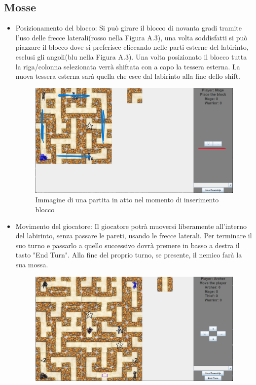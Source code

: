 \documentclass[a4paper,12pt]{report}
\begin{document}
\subsection*{Mosse}
\begin{itemize}
	\item Posizionamento del blocco: Si può girare il blocco di novanta gradi tramite l'uso delle frecce laterali(rosso nella Figura A.3), 
	una volta soddisfatti si può piazzare il blocco dove si preferisce cliccando nelle parti esterne del labirinto, esclusi gli angoli(blu nella Figura A.3).
	Una volta posizionato il blocco tutta la riga/colonna selezionata verrà shiftata con a capo la tessera esterna. La nuova tessera esterna sarà quella che 
	esce dal labirinto alla fine dello shift.
	\begin{figure}[H]
		\includegraphics[width=\textwidth]{img/EsempioDiPrimoTurno.png}
		\caption{Immagine di una partita in atto nel momento di inserimento blocco}
		\label{img:Esempio di primo turno}
	\end{figure}
	\item Movimento del giocatore: Il giocatore potrà muoversi liberamente all'interno del labirinto, senza passare le pareti, usando le frecce laterali. 
	Per terminare il suo turno e passarlo a quello successivo dovrà premere in basso a destra il tasto "End Turn".
	Alla fine del proprio turno, se presente, il nemico farà la sua mossa.
	\begin{figure}[H]
		\includegraphics[width=\textwidth]{img/PartitaInAtto.png}

\end{figure}
\end{itemize}
\end{document}
